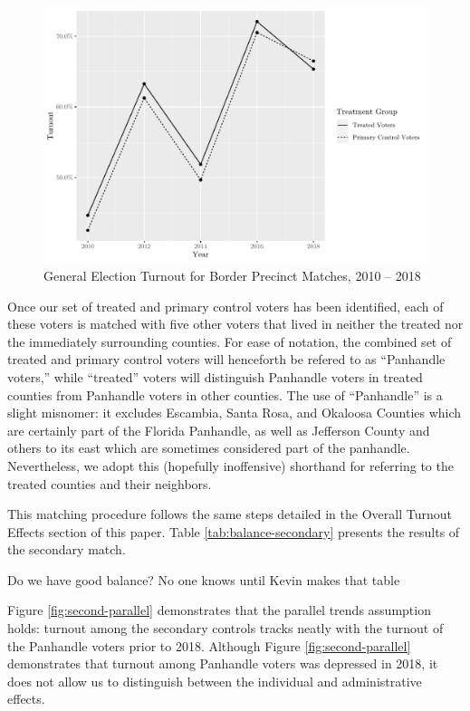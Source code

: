 \documentclass[
  12pt,
]{article}
\begin{document}
\begin{figure}[H]

{\centering \includegraphics{hurricane_michael_files/figure-latex/ll-to-chunk-1} 

}

\caption{\label{fig:ll-to}General Election Turnout for Border Precinct Matches, 2010 -- 2018}\label{fig:ll-to-chunk}
\end{figure}

Once our set of treated and primary control voters has been identified, each of these voters is matched with five other voters that lived in neither the treated nor the immediately surrounding counties. For ease of notation, the combined set of treated and primary control voters will henceforth be refered to as ``Panhandle voters,'' while ``treated'' voters will distinguish Panhandle voters in treated counties from Panhandle voters in other counties. The use of ``Panhandle'' is a slight misnomer: it excludes Escambia, Santa Rosa, and Okaloosa Counties which are certainly part of the Florida Panhandle, as well as Jefferson County and others to its east which are sometimes considered part of the panhandle. Nevertheless, we adopt this (hopefully inoffensive) shorthand for referring to the treated counties and their neighbors.

This matching procedure follows the same steps detailed in the Overall Turnout Effects section of this paper. Table \ref{tab:balance-secondary} presents the results of the secondary match.

Do we have good balance? No one knows until Kevin makes that table

Figure \ref{fig:second-parallel} demonstrates that the parallel trends assumption holds: turnout among the secondary controls tracks neatly with the turnout of the Panhandle voters prior to 2018. Although Figure \ref{fig:second-parallel} demonstrates that turnout among Panhandle voters was depressed in 2018, it does not allow us to distinguish between the individual and administrative effects.
\end{document}
